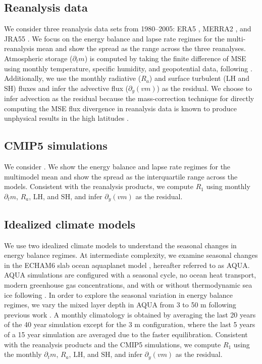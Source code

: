 \documentclass{ametsocV5}
\begin{document}
    \subsection{Reanalysis data}\label{subsec:reanalysis}
    We consider three reanalysis data sets from 1980--2005: ERA5 \citep{hersbach2020}, MERRA2 \citep{gelaro2017}, and JRA55 \citep{kobayashi2015}. We focus on the energy balance and lapse rate regimes for the multi-reanalysis mean and show the spread as the range across the three reanalyses. Atmospheric storage ($\partial_t m$) is computed by taking the finite difference of MSE using monthly temperature, specific humidity, and geopotential data, following \cite{donohoe2013}. Additionally, we use the monthly radiative ($R_a$) and surface turbulent ($\mathrm{LH}$ and $\mathrm{SH}$) fluxes and infer the advective flux ($\partial_y (vm)$) as the residual. We choose to infer advection as the residual because the mass-correction technique for directly computing the MSE flux divergence in reanalysis data is known to produce unphysical results in the high latitudes \citep{porter2010}. 

    \subsection{CMIP5 simulations}
    We consider  \citep[Table~B1,][]{taylor2012}. We show the energy balance and lapse rate regimes for the multimodel mean and show the spread as the interquartile range across the models. Consistent with the reanalysis products, we compute $R_1$ using monthly $\partial_t m$, $R_a$, $\mathrm{LH}$, and $\mathrm{SH}$, and infer $\partial_y (vm) $ as the residual.

    \subsection{Idealized climate models}\label{subsec:models}
    We use two idealized climate models to understand the seasonal changes in energy balance regimes. At intermediate complexity, we examine seasonal changes in the ECHAM6 slab ocean aquaplanet model \citep{stevens2013}, hereafter referred to as AQUA. AQUA simulations are configured with a seasonal cycle, no ocean heat transport, modern greenhouse gas concentrations, and with or without thermodynamic sea ice following \cite{shaw2020}. In order to explore the seasonal variation in energy balance regimes, we vary the mixed layer depth in AQUA from 3 to 50 m following previous work \citep{donohoe2014, barpanda2020}. A monthly climatology is obtained by averaging the last 20 years of the 40 year simulation except for the 3 m configuration, where the last 5 years of a 15 year simulation are averaged due to the faster equilibration. Consistent with the reanalysis products and the CMIP5 simulations, we compute $R_1$ using the monthly $\partial_t m$, $R_a$, $\mathrm{LH}$, and $\mathrm{SH}$, and infer $\partial_y (vm) $ as the residual.
\end{document}
